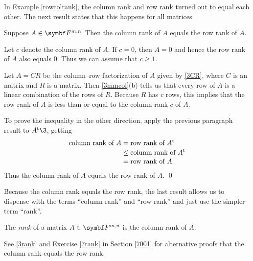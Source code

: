 In Example \ref{rowcolrank}, the column rank and row rank turned out to equal each other. The next result states that this happens for all matrices.

{Suppose $A \in \FF{m, n}$. Then the column rank of $A$ equals the row rank of $A$.}

\proof
Let $c$ denote the column rank of $A$. If $c = 0$, then $A = 0$ and hence the row rank of $A$ also equals $0$. Thus we can assume that $c \ge 1$.

Let $A = CR$ be the column--row factorization of $A$ given by \ref{3CR}, where $C$ is an  matrix and $R$ is a  matrix. Then \ref{3mmcol}(b) tells us that every row of $A$ is a linear combination of the rows of $R$. Because $R$ has $c$ rows, this implies that the row rank of $A$ is less than or equal to the column rank $c$ of $A$.

To prove the inequality in the other direction, apply the previous paragraph result to $\tran{A}\3$, getting
\vspace{-.13in} %
\begin{align*}
\text{column rank of } A &= \text{row rank of } A^{\text{t}}\\[-2bp]
&\le \text{column rank of } A^{\text{t}}\\[-2bp]
&= \text{row rank of } A.
\end{align*}
\vspace{-.1in}
Thus the column rank of $A$ equals the row rank of $A$.
\qed

\pagebreak[3]

Because the column rank equals the row rank, the last result allows us to dispense with the terms ``column rank'' and ``row rank'' and just use the simpler term ``rank''\!.

{The \emph{rank} of a matrix $A \in \F{m,n}$ is the column rank of $A$.}

See \ref{3rank} and Exercise \ref{7rank} in Section \ref{7001} for alternative proofs that the column rank equals the row rank.

